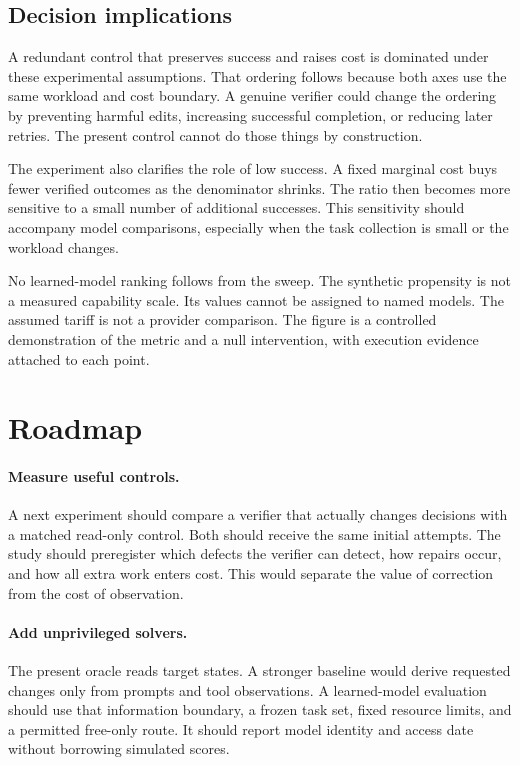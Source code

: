\documentclass{article}
\begin{document}
\subsection{Decision implications}
A redundant control that preserves success and raises cost is dominated under these experimental assumptions. That ordering follows because both axes use the same workload and cost boundary. A genuine verifier could change the ordering by preventing harmful edits, increasing successful completion, or reducing later retries. The present control cannot do those things by construction.\par
The experiment also clarifies the role of low success. A fixed marginal cost buys fewer verified outcomes as the denominator shrinks. The ratio then becomes more sensitive to a small number of additional successes. This sensitivity should accompany model comparisons, especially when the task collection is small or the workload changes.\par
No learned-model ranking follows from the sweep. The synthetic propensity is not a measured capability scale. Its values cannot be assigned to named models. The assumed tariff is not a provider comparison. The figure is a controlled demonstration of the metric and a null intervention, with execution evidence attached to each point.\par
\section{Roadmap}
\paragraph{Measure useful controls.} A next experiment should compare a verifier that actually changes decisions with a matched read-only control. Both should receive the same initial attempts. The study should preregister which defects the verifier can detect, how repairs occur, and how all extra work enters cost. This would separate the value of correction from the cost of observation.
\paragraph{Add unprivileged solvers.} The present oracle reads target states. A stronger baseline would derive requested changes only from prompts and tool observations. A learned-model evaluation should use that information boundary, a frozen task set, fixed resource limits, and a permitted free-only route. It should report model identity and access date without borrowing simulated scores.
\end{document}
